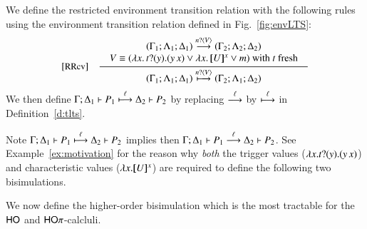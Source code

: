 \begin{definition}
\label{def:rlts}
We define the restricted environment transition relation with the following 
rules using the environment transition relation defined in 
Fig.~\ref{fig:envLTS}: 
\[
\begin{array}{rl}
		\eltsrule{RRcv}&\tree {
\begin{array}{c}
(\Gamma_1; \Lambda_1; \Delta_1) \by{\bactinp{n}{V}} (\Gamma_2; \Lambda_2; \Delta_2)
\\
			\begin{array}{lll}
				 V  \scong
(\abs{{x}}{\binp{t}{y} (\appl{y}{{x}})}
 \vee  \abs{{x}}{\map{U}^{{x}}}  \vee m)  \textrm{ with } t \textrm{ fresh} 
			\end{array}
			\end{array}
		}{
			(\Gamma_1; \Lambda_1; \Delta_1) \hby{\bactinp{n}{V}} (\Gamma_2; \Lambda_1; \Delta_2)
		}
\end{array}
\]
We then define 
$\Gamma; \Delta_1 \vdash P_1 \stackrel{\ell}{\longmapsto} \Delta_2 \vdash P_2$
by replacing $\stackrel{\ell}{\longrightarrow}$ by $\stackrel{\ell}{\longmapsto}$ in Definition~\ref{d:tlts}. 
\end{definition}

\smallskip 

\noi Note 
$\Gamma; \Delta_1 \vdash P_1 \stackrel{\ell}{\longmapsto} \Delta_2 \vdash P_2$ implies  
	then $\Gamma; \Delta_1 \vdash P_1 \stackrel{\ell}{\longrightarrow} \Delta_2 \vdash P_2$.
See Example~\ref{ex:motivation} for the reason why {\em both} 
the trigger values ($\lambda x.t ? (y) . (y\, {{x}})$) 
and characteristic values ($\lambda x.[\!\![U]\!\!]^{{x}}$) are required 
to define the following two bisimulations. 

\smallskip 

 We now define 
the higher-order bisimulation which is the most tractable for 
the $\mathsf{HO}$ and $\mathsf{HO}\pi$-calcluli. 

\smallskip 

